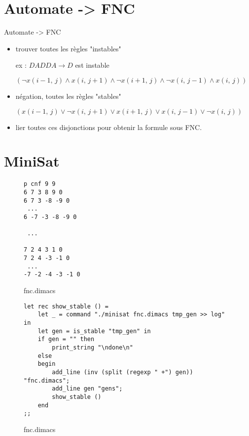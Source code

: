 \documentclass[10pt]{beamer}
\begin{document}
\section{Automate -> FNC}

\begin{frame}{Automate -> FNC}
	\begin{itemize}[<+- | alert@+>]
		\item trouver toutes les règles "instables"
		
		ex : $DADDA \rightarrow D$ est instable
		
		 $(\neg x(i-1,\, j) \wedge x(i,\, j+1) \wedge \neg x(i+1,\, j) \wedge \neg x(i,\, j-1) \wedge x(i,\, j))$
		 
		\item négation, toutes les règles "stables"
		
		$( x(i-1,\, j) \vee \neg x(i,\, j+1) \vee x(i+1,\, j) \vee x(i,\, j-1) \vee \neg x(i,\, j))$
		
		\item lier toutes ces disjonctions pour obtenir la formule sous FNC.
		
	\end{itemize}
\end{frame}


\section{MiniSat}

\begin{frame}[fragile]
\lstset{
	basicstyle=\footnotesize, frame=tb,
	xleftmargin=.2\textwidth, xrightmargin=.2\textwidth
	}
\begin{figure}
\caption{fnc.dimacs}
\begin{lstlisting}
p cnf 9 9
6 7 3 8 9 0
6 7 3 -8 -9 0
 ...
6 -7 -3 -8 -9 0

 ...

7 2 4 3 1 0
7 2 4 -3 -1 0
 ...
-7 -2 -4 -3 -1 0
\end{lstlisting}
\end{figure}
\end{frame}

\begin{frame}[fragile]
\lstset{basicstyle=\footnotesize}
\begin{figure}
\caption{fnc.dimacs}
\begin{lstlisting}
let rec show_stable () =
    let _ = command "./minisat fnc.dimacs tmp_gen >> log" in
    let gen = is_stable "tmp_gen" in
    if gen = "" then
        print_string "\ndone\n"
    else
    begin
        add_line (inv (split (regexp " +") gen)) "fnc.dimacs";
        add_line gen "gens";
        show_stable ()
    end
;;
\end{lstlisting}
\end{figure}
\end{frame}

\end{document}
